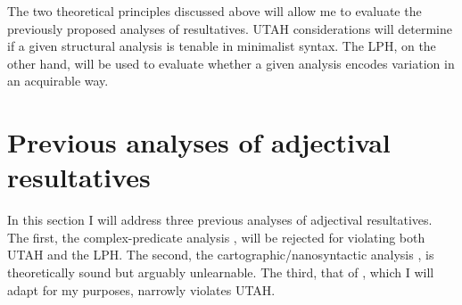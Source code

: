 \documentclass[MilwayThesis]{subfiles}
\begin{document}
%
%
%
%
%
%

The two theoretical principles discussed above will allow me to evaluate the previously proposed analyses of resultatives.
UTAH considerations will determine if a given structural analysis is tenable in minimalist syntax.
The LPH, on the other hand, will be used to evaluate whether a given analysis encodes variation in an acquirable way.

\section{Previous analyses of adjectival resultatives}
In this section I will address three previous analyses of adjectival resultatives.
The first, the complex-predicate analysis \parencite{snyder1995language,irimia2012secondary}, will be rejected for violating both UTAH and the LPH.
The second, the cartographic/nanosyntactic analysis \parencite{son2008microparameters}, is theoretically sound but arguably unlearnable.
The third, that of \textcite{kratzer2004building}, which I will adapt for my purposes, narrowly violates UTAH.
\end{document}
